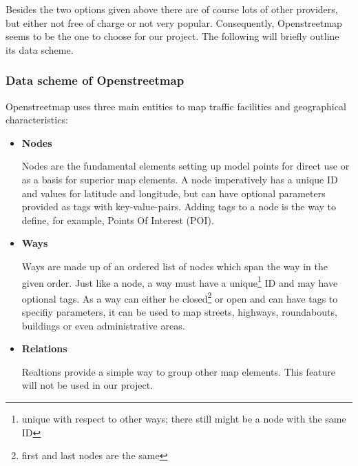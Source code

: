 Besides the two options given above there are of course lots of other providers, but either not free of charge or not very popular. Consequently, Openstreetmap seems to be the one to choose for our project. The following will briefly outline its data scheme.\newline

\subsubsection{Data scheme of Openstreetmap}

Openstreetmap uses three main entities to map traffic facilities and geographical characteristics:

\begin{itemize}

	\item \textbf{Nodes}
	
		Nodes are the fundamental elements setting up model points for direct use or as a basis for superior map elements. A node imperatively has a unique ID and values for latitude and longitude, but can have optional parameters provided as tags with key-value-pairs. Adding tags to a node is the way to define, for example, Points Of Interest (POI).
		
	\item \textbf{Ways}
	
		Ways are made up of an ordered list of nodes which span the way in the given order. Just like a node, a way must have a unique\footnote{unique with respect to other ways; there still might be a node with the same ID} ID and may have optional tags.\newline
		As a way can either be closed\footnote{first and last nodes are the same} or open and can have tags to specifiy parameters, it can be used to map streets, highways, roundabouts, buildings or even administrative areas.	
		
	\item \textbf{Relations}
	
		Realtions provide a simple way to group other map elements. This feature will not be used in our project.
	
\end{itemize}
